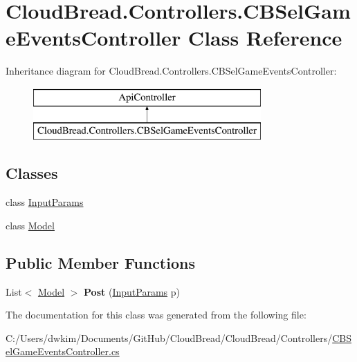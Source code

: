 \hypertarget{class_cloud_bread_1_1_controllers_1_1_c_b_sel_game_events_controller}{}\section{Cloud\+Bread.\+Controllers.\+C\+B\+Sel\+Game\+Events\+Controller Class Reference}
\label{class_cloud_bread_1_1_controllers_1_1_c_b_sel_game_events_controller}
Inheritance diagram for Cloud\+Bread.\+Controllers.\+C\+B\+Sel\+Game\+Events\+Controller\+:\begin{figure}[H]
\begin{center}
\leavevmode
\includegraphics[height=2.000000cm]{class_cloud_bread_1_1_controllers_1_1_c_b_sel_game_events_controller}
\end{center}
\end{figure}
\subsection*{Classes}
\begin{DoxyCompactItemize}
\item 
class \hyperlink{class_cloud_bread_1_1_controllers_1_1_c_b_sel_game_events_controller_1_1_input_params}{Input\+Params}
\item 
class \hyperlink{class_cloud_bread_1_1_controllers_1_1_c_b_sel_game_events_controller_1_1_model}{Model}
\end{DoxyCompactItemize}
\subsection*{Public Member Functions}
\begin{DoxyCompactItemize}
\item 
List$<$ \hyperlink{class_cloud_bread_1_1_controllers_1_1_c_b_sel_game_events_controller_1_1_model}{Model} $>$ {\bfseries Post} (\hyperlink{class_cloud_bread_1_1_controllers_1_1_c_b_sel_game_events_controller_1_1_input_params}{Input\+Params} p)\hypertarget{class_cloud_bread_1_1_controllers_1_1_c_b_sel_game_events_controller_a4b7d48b96dfb8d43e274be9d685e824c}{}\label{class_cloud_bread_1_1_controllers_1_1_c_b_sel_game_events_controller_a4b7d48b96dfb8d43e274be9d685e824c}

\end{DoxyCompactItemize}


The documentation for this class was generated from the following file\+:\begin{DoxyCompactItemize}
\item 
C\+:/\+Users/dwkim/\+Documents/\+Git\+Hub/\+Cloud\+Bread/\+Cloud\+Bread/\+Controllers/\hyperlink{_c_b_sel_game_events_controller_8cs}{C\+B\+Sel\+Game\+Events\+Controller.\+cs}\end{DoxyCompactItemize}
